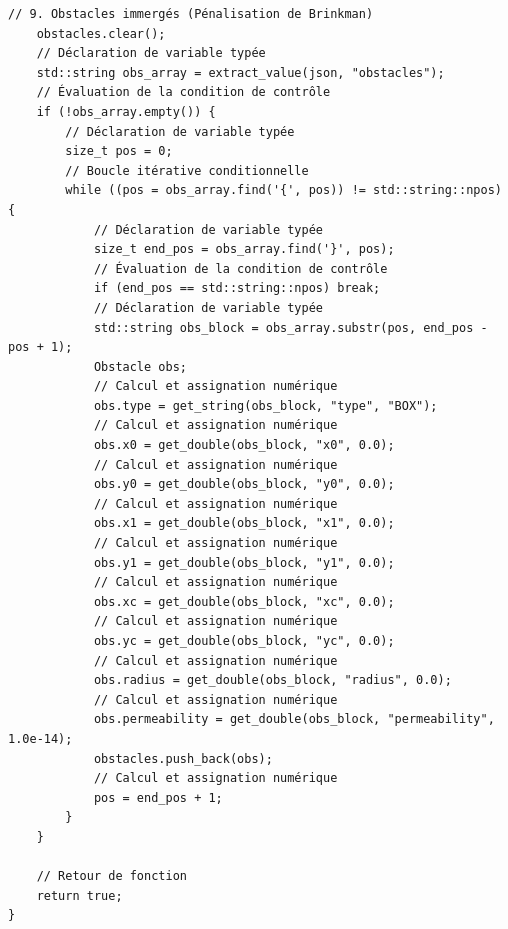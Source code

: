 \documentclass[10pt,a4paper,oneside]{book}
\begin{document}
\begin{lstlisting}[language={[11]C++}]
    // 9. Obstacles immergés (Pénalisation de Brinkman)
    obstacles.clear();
    // Déclaration de variable typée
    std::string obs_array = extract_value(json, "obstacles");
    // Évaluation de la condition de contrôle
    if (!obs_array.empty()) {
        // Déclaration de variable typée
        size_t pos = 0;
        // Boucle itérative conditionnelle
        while ((pos = obs_array.find('{', pos)) != std::string::npos) {
            // Déclaration de variable typée
            size_t end_pos = obs_array.find('}', pos);
            // Évaluation de la condition de contrôle
            if (end_pos == std::string::npos) break;
            // Déclaration de variable typée
            std::string obs_block = obs_array.substr(pos, end_pos - pos + 1);
            Obstacle obs;
            // Calcul et assignation numérique
            obs.type = get_string(obs_block, "type", "BOX");
            // Calcul et assignation numérique
            obs.x0 = get_double(obs_block, "x0", 0.0);
            // Calcul et assignation numérique
            obs.y0 = get_double(obs_block, "y0", 0.0);
            // Calcul et assignation numérique
            obs.x1 = get_double(obs_block, "x1", 0.0);
            // Calcul et assignation numérique
            obs.y1 = get_double(obs_block, "y1", 0.0);
            // Calcul et assignation numérique
            obs.xc = get_double(obs_block, "xc", 0.0);
            // Calcul et assignation numérique
            obs.yc = get_double(obs_block, "yc", 0.0);
            // Calcul et assignation numérique
            obs.radius = get_double(obs_block, "radius", 0.0);
            // Calcul et assignation numérique
            obs.permeability = get_double(obs_block, "permeability", 1.0e-14);
            obstacles.push_back(obs);
            // Calcul et assignation numérique
            pos = end_pos + 1;
        }
    }

    // Retour de fonction
    return true;
}


\end{lstlisting}
\end{document}
